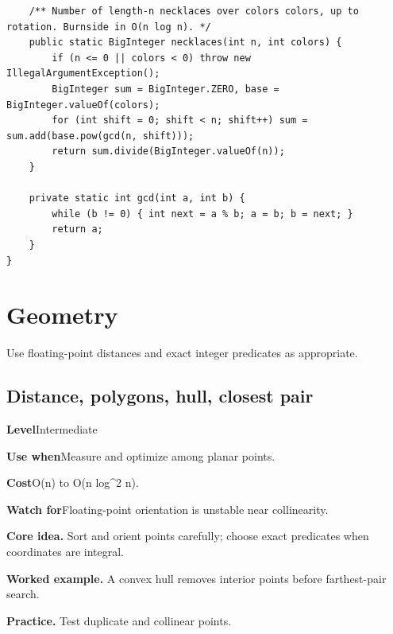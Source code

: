 \documentclass[10pt,letterpaper]{article}
\newcommand{\entrylabel}[1]{\textcolor{accent}{\bfseries #1}}
\begin{document}
\begin{lstlisting}
    /** Number of length-n necklaces over colors colors, up to rotation. Burnside in O(n log n). */
    public static BigInteger necklaces(int n, int colors) {
        if (n <= 0 || colors < 0) throw new IllegalArgumentException();
        BigInteger sum = BigInteger.ZERO, base = BigInteger.valueOf(colors);
        for (int shift = 0; shift < n; shift++) sum = sum.add(base.pow(gcd(n, shift)));
        return sum.divide(BigInteger.valueOf(n));
    }

    private static int gcd(int a, int b) {
        while (b != 0) { int next = a % b; a = b; b = next; }
        return a;
    }
}
\end{lstlisting}
\section{Geometry}
\begin{guidebox}Use floating-point distances and exact integer predicates as appropriate.\end{guidebox}
\subsection{Distance, polygons, hull, closest pair}
\begin{guidebox}\small
\entrylabel{Level}\quad Intermediate\par
\entrylabel{Use when}\quad Measure and optimize among planar points.\par
\entrylabel{Cost}\quad O(n) to O(n log\textasciicircum{}2 n).\par
\entrylabel{Watch for}\quad Floating-point orientation is unstable near collinearity.\par
\end{guidebox}
\noindent\textbf{Core idea.} Sort and orient points carefully; choose exact predicates when coordinates are integral.\par
\noindent\textbf{Worked example.} A convex hull removes interior points before farthest-pair search.\par
\noindent\textbf{Practice.} Test duplicate and collinear points.\par
\end{document}
